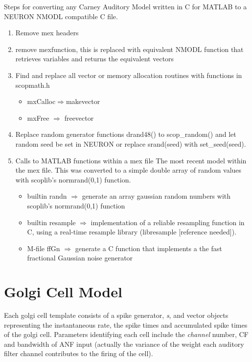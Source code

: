 Steps for converting any Carney Auditory Model written in C for MATLAB to a
NEURON NMODL compatible C file.
\begin{enumerate} 
\item Remove mex headers 
\item remove \textsf{mexfunction}, this is replaced with equivalent NMODL
  function that retrieves variables and returns the equivalent vectors
\item Find and replace all vector or memory allocation routines with functions
  in scopmath.h
\begin{itemize} 
\item \textsf{mxCalloc}$\Rightarrow$\textsf{makevector}
\item \textsf{mxFree} $\Rightarrow$ \textsf{freevector}
\end{itemize} 
\item Replace random generator functions \textsf{drand48()} to
  \mbox{\textsf{scop\_random()}} and let random seed be set in NEURON or replace
  \textsf{srand(seed)} with \mbox{\textsf{set\_seed(seed)}}.
\item Calls to MATLAB functions within a mex file The most recent model within
  the mex file.  This was converted to a simple double array of random values
  with scoplib's \mbox{\textsf{normrand(0,1)}} function.
\begin{itemize}
\item builtin \textsf{randn} $\Rightarrow$ generate an array gaussian random numbers with scoplib's
  \mbox{\textsf{normrand(0,1)}} function
\item builtin \textsf{resample} $\Rightarrow$ implementation of a reliable resampling function in C, using
  a real-time resample library (libresample [reference needed]).
\item M-file \textsf{ffGn} $\Rightarrow$ generate a C function that implements a the fast fractional Gaussian noise generator
\end{itemize}

\end{enumerate}





\section{Golgi Cell Model}

 Each golgi cell template consists of a
spike generator, \emph{s}, and vector objects representing the instantaneous
rate, the spike times and accumulated spike times of the golgi cell. Parameters
identifying each cell include the \emph{channel} number, CF and bandwidth of ANF
input (actually the variance of the weight each auditory filter channel
contributes to the firing of the cell).

